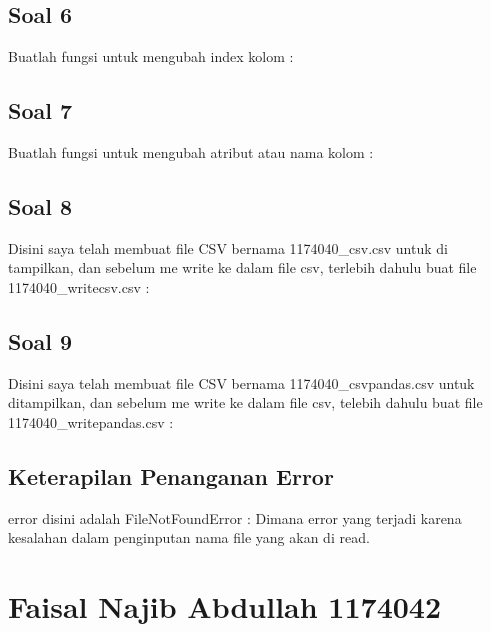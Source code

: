 \subsection{Soal 6}
Buatlah fungsi  untuk mengubah index kolom : 


\subsection{Soal 7}
Buatlah fungsi  untuk mengubah atribut atau nama kolom : 


\subsection{Soal 8}
Disini saya telah membuat file CSV bernama 1174040\_csv.csv untuk di tampilkan, dan sebelum me write ke dalam file csv, terlebih dahulu buat file 1174040\_writecsv.csv : 


\subsection{Soal 9}
Disini saya telah membuat file CSV bernama 1174040\_csvpandas.csv untuk ditampilkan, dan sebelum me write ke dalam file csv, telebih dahulu buat file 1174040\_writepandas.csv : 


\subsection{Keterapilan Penanganan Error}
	error disini adalah FileNotFoundError : Dimana error yang terjadi karena kesalahan dalam penginputan nama file yang akan di read.

	

\section{Faisal Najib Abdullah 1174042}
